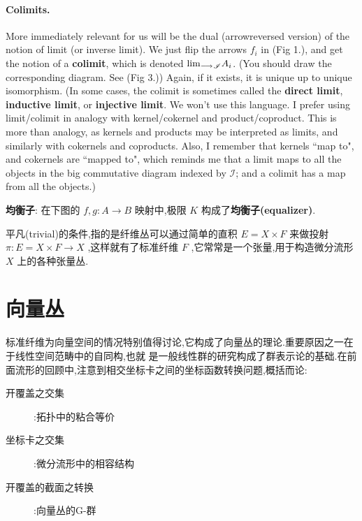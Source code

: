 \paragraph{Colimits.} More immediately relevant for us will be the dual (arrowreversed version) of the notion of limit (or inverse limit). We just flip the arrows $f_i$ in (Fig 1.), and get the notion of a \textbf{colimit}, which is denoted ${\lim _{\longrightarrow}}_{{\mathscr I}} A_i$. (You should draw the corresponding diagram. See (Fig 3.)) Again, if it exists, it is unique up to unique isomorphism. (In some cases, the colimit is sometimes called the \textbf{direct limit}, \textbf{inductive limit}, or \textbf{injective limit}. We won't use this language. I prefer using limit/colimit in analogy with kernel/cokernel and product/coproduct. This is more than analogy, as kernels and products may be interpreted as limits, and similarly with cokernels and coproducts. Also, I remember that kernels ``map to", and cokernels are ``mapped to", which reminds me that a limit maps to all the objects in the big commutative diagram indexed by $\mathscr{I}$; and a colimit has a map from all the objects.)

\textbf{均衡子}: 在下图的 $f, g: A \rightarrow B$ 映射中,极限 $K$ 构成了\textbf{均衡子(equalizer)}.

  \begin{center}
\end{center}

平凡(trivial)的条件,指的是纤维丛可以通过简单的直积 $E=X \times F$ 来做投射 $\pi: E=X \times F \rightarrow X$ ,这样就有了标准纤维 $F$ ,它常常是一个张量,用于构造微分流形 $X$ 上的各种张量丛.
\section{向量丛}
标准纤维为向量空间的情况特别值得讨论,它构成了向量丛的理论.重要原因之一在于线性空间范畴中的自同构,也就 是一般线性群的研究构成了群表示论的基础.在前面流形的回顾中,注意到相交坐标卡之间的坐标函数转换问题,概括而论:
\begin{description}
    \item[开覆盖之交集]:拓扑中的粘合等价
    \item[坐标卡之交集]:微分流形中的相容结构
    \item[开覆盖的截面之转换]:向量丛的G-群
\end{description}

